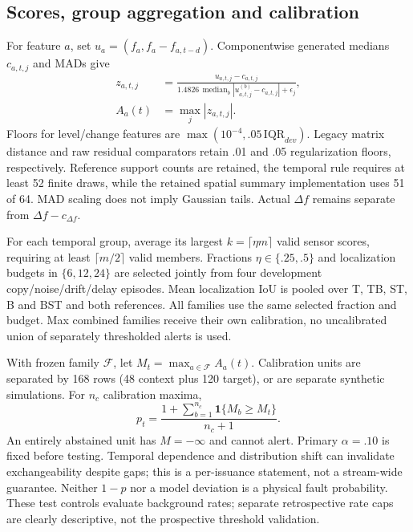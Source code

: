 \documentclass{llncs}
\begin{document}
\subsection{Scores, group aggregation and calibration}
For feature $a$, set $u_a=(f_a, f_a-f_{a,t-d})$. Componentwise generated medians
$c_{a,t,j}$ and MADs give
\begin{align}
z_{a,t,j}&=\frac{u_{a,t,j}-c_{a,t,j}}{1.4826\,\operatorname{median}_b|u^{(b)}_{a,t,j}-c_{a,t,j}|+\epsilon_j},\\
A_a(t)&=\max_j|z_{a,t,j}|.\label{eq:score}
\end{align}
Floors for level/change features are $\max(10^{-4},.05\,\mathrm{IQR}_{dev})$.
Legacy matrix distance and raw residual comparators retain .01 and .05
regularization floors, respectively. Reference support counts are retained,
the temporal rule requires at least 52 finite draws, while the retained spatial
summary implementation uses 51 of 64. MAD scaling does not imply Gaussian tails.
Actual $\Delta f$ remains separate from $\Delta f-c_{\Delta f}$.

For each temporal group, average its largest $k=\lceil\eta m\rceil$ valid sensor
scores, requiring at least $\lceil m/2\rceil$ valid members. Fractions
$\eta\in\{.25,.5\}$ and localization budgets in $\{6,12,24\}$ are selected
jointly from four development copy/noise/drift/delay episodes. Mean localization
IoU is pooled over T, TB, ST, B and BST and both references. All families use
the same selected fraction and budget. Max combined families receive their
own calibration, no uncalibrated union of separately thresholded alerts is used.

With frozen family $\mathcal F$, let $M_t=\max_{a\in\mathcal F}A_a(t)$.
Calibration units are separated by 168 rows (48 context plus 120 target), or
are separate synthetic simulations. For $n_c$ calibration maxima,
\begin{equation}
p_t=\frac{1+\sum_{b=1}^{n_c}\mathbf1\{M_b\geq M_t\}}{n_c+1}.
\label{eq:rank}
\end{equation}
An entirely abstained unit has $M=-\infty$ and cannot alert. Primary
$\alpha=.10$ is fixed before testing. Temporal dependence and distribution
shift can invalidate exchangeability despite gaps; this is a per-issuance
statement, not a stream-wide guarantee. Neither $1-p$ nor a model deviation
is a physical fault probability. These test controls evaluate background rates;
separate retrospective rate caps are clearly descriptive, not the prospective
threshold validation.
\end{document}
